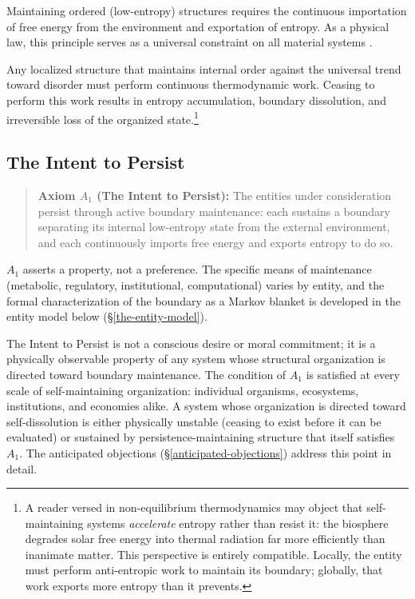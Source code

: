 \documentclass[11pt]{article}
\theoremstyle{plain}
\theoremstyle{definition}
\theoremstyle{remark}
\let\origsubsection\subsection
\renewcommand{\subsection}{\needspace{7\baselineskip}\origsubsection}
\begin{document}
Maintaining ordered (low-entropy) structures requires the continuous
importation of free energy from the environment and exportation of
entropy. As a physical law, this principle serves as a universal
constraint on all material systems
\citep{Clausius1865, Boltzmann1877, Planck1900}.

Any localized structure that maintains internal order against the
universal trend toward disorder must perform continuous thermodynamic
work. Ceasing to perform this work results in entropy accumulation,
boundary dissolution, and irreversible loss of the organized
state.\footnote{A reader versed in non-equilibrium thermodynamics may
  object that self-maintaining systems \emph{accelerate} entropy rather
  than resist it: the biosphere degrades solar free energy into thermal
  radiation far more efficiently than inanimate matter. This perspective
  is entirely compatible. Locally, the entity must perform anti-entropic
  work to maintain its boundary; globally, that work exports more
  entropy than it prevents.}

\subsection{The Intent to Persist}\label{the-intent-to-persist}

\begin{quote}
\textbf{Axiom \(A_1\) (The Intent to Persist):} The entities under
consideration persist through active boundary maintenance: each sustains
a boundary separating its internal low-entropy state from the external
environment, and each continuously imports free energy and exports
entropy to do so.
\end{quote}

\(A_1\) asserts a property, not a preference. The specific means of
maintenance (metabolic, regulatory, institutional, computational) varies
by entity, and the formal characterization of the boundary as a Markov
blanket \citep{Pearl2000, Friston2013} is developed in the entity model
below (§\ref{the-entity-model}).

The Intent to Persist is not a conscious desire or moral commitment; it
is a physically observable property of any system whose structural
organization is directed toward boundary maintenance. The condition of
\(A_1\) is satisfied at every scale of self-maintaining organization:
individual organisms, ecosystems, institutions, and economies alike. A
system whose organization is directed toward self-dissolution is either
physically unstable (ceasing to exist before it can be evaluated) or
sustained by persistence-maintaining structure that itself satisfies
\(A_1\). The anticipated objections (§\ref{anticipated-objections})
address this point in detail.
\end{document}
